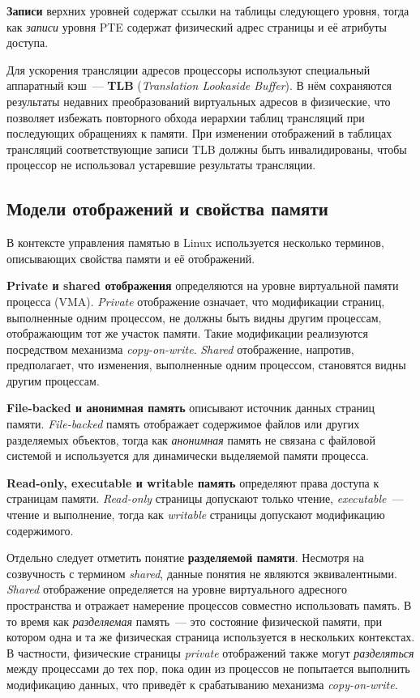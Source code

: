 \textbf{Записи} верхних уровней содержат ссылки на таблицы следующего уровня, тогда как \textit{записи} уровня PTE содержат физический адрес страницы и её атрибуты доступа.

Для ускорения трансляции адресов процессоры используют специальный аппаратный кэш~--- \textbf{TLB} (\textit{Translation Lookaside Buffer}). В нём сохраняются результаты недавних преобразований виртуальных адресов в физические, что позволяет избежать повторного обхода иерархии таблиц трансляций при последующих обращениях к памяти. При изменении отображений в таблицах трансляций соответствующие записи TLB должны быть инвалидированы, чтобы процессор не использовал устаревшие результаты трансляции.

\subsection{Модели отображений и свойства памяти}

В контексте управления памятью в Linux используется несколько терминов, описывающих свойства памяти и её отображений.

\textbf{Private и shared отображения} определяются на уровне виртуальной памяти процесса (VMA). \textit{Private} отображение означает, что модификации страниц, выполненные одним процессом, не должны быть видны другим процессам, отображающим тот же участок памяти. Такие модификации реализуются посредством механизма \textit{copy-on-write}. \textit{Shared} отображение, напротив, предполагает, что изменения, выполненные одним процессом, становятся видны другим процессам.

\textbf{File-backed и анонимная память} описывают источник данных страниц памяти. \textit{File-backed} память отображает содержимое файлов или других разделяемых объектов, тогда как \textit{анонимная} память не связана с файловой системой и используется для динамически выделяемой памяти процесса.

\textbf{Read-only, executable и writable память} определяют права доступа к страницам памяти. \textit{Read-only} страницы допускают только чтение, \textit{executable}~--- чтение и выполнение, тогда как \textit{writable} страницы допускают модификацию содержимого.

Отдельно следует отметить понятие \textbf{разделяемой памяти}. Несмотря на созвучность с термином \textit{shared}, данные понятия не являются эквивалентными. \textit{Shared} отображение определяется на уровне виртуального адресного пространства и отражает намерение процессов совместно использовать память. В то время как \textit{разделяемая} память~--- это состояние физической памяти, при котором одна и та же физическая страница используется в нескольких контекстах. В частности, физические страницы \textit{private} отображений также могут \textit{разделяться} между процессами до тех пор, пока один из процессов не попытается выполнить модификацию данных, что приведёт к срабатыванию механизма \textit{copy-on-write}.

